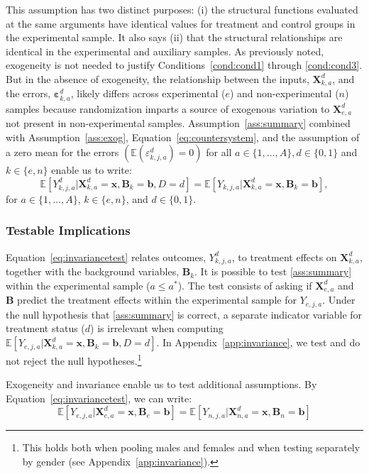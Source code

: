 This assumption has two distinct purposes: (i) the structural functions evaluated at the same arguments have identical values for treatment and control groups in the experimental sample. It also says (ii) that the structural relationships are identical in the experimental and auxiliary samples. As previously noted, exogeneity is not needed to justify Conditions~\ref{cond:cond1} through \ref{cond:cond3}. But in the absence of exogeneity, the relationship between the inputs, $\bm{X}^d_{k,a}$, and the errors, $\bm{\varepsilon}^d_{k,a}$, likely differs across experimental ($e$) and non-experimental ($n$) samples because randomization imparts a source of exogenous variation to $\bm{X}^d_{e,a}$ not present in non-experimental samples. Assumption~\ref{ass:summary} combined with Assumption~\ref{ass:exog}, Equation~\eqref{eq:countersystem}, and the assumption of a zero mean for the errors $(\mathbb{E}(\varepsilon^d_{k,j,a})=0)$ for all $a \in \{1,\dots,A\}, d \in \{0,1\}$ and $k \in \{e,n\}$ enable us to write:
\begin{equation}\label{eq:invariancetest}
\mathbb{E} \left[ Y_{k,j,a}^d | \bm{X}_{k,a}^d  = \bm{x}, \bm{B}_k = \bm{b}, D = d \right] = \mathbb{E} \left[ Y_{k,j,a} | \bm{X}^d_{k,a}  = \bm{x}, \bm{B}_k = \bm{b} \right],
\end{equation}
for $a \in \{1,\dots,A\}$, $k \in \{e,n\}$, and $d \in \{0,1\}$.

\subsubsection{Testable Implications}

Equation~\eqref{eq:invariancetest} relates outcomes, $Y_{k,j,a}^d$, to treatment effects on $\bm{X}_{k,a}^d$, together with the background variables, $\bm{B}_k$. It is possible to test \ref{ass:summary} within the experimental sample ($a \leq a^*$). The test consists of asking if $\bm{X}_{e,a}^d$ and $\bm{B}$ predict the treatment effects within the experimental sample for $Y_{e,j,a}$. Under the null hypothesis that \ref{ass:summary} is correct, a separate indicator variable for treatment status ($d$) is irrelevant when computing $\mathbb{E} \left[ Y_{e,j,a} | \bm{X}_{k,a}^d  = \bm{x}, \bm{B}_k =  \bm{b}, D = d \right]$. In  Appendix~\ref{app:invariance}, we test and do not reject the null hypotheses.\footnote{This holds both when pooling males and females and when testing separately by gender (see  Appendix~\ref{app:invariance}).}

Exogeneity and invariance enable us to test additional assumptions. By Equation~\eqref{eq:invariancetest}, we can write:
\begin{equation}\label{eq:withbetimplication}
\mathbb{E} \left[ Y_{e,j,a} | \bm{X}^d_{e,a} = \bm{x}, \bm{B}_e = \bm{b} \right] = \mathbb{E} \left[ Y_{n,j,a} | \bm{X}^d_{n,a} = \bm{x}, \bm{B}_n = \bm{b} \right]
\end{equation}

